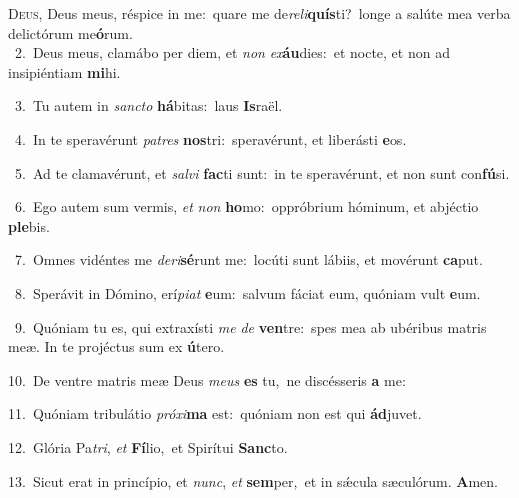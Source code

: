 \lettrine{\initial\textcolor{\initialcolor}{D}}{eus,} Deus meus, réspice in me:~\dagger quare me de\-\textit{re}\-\textit{li}\textbf{quís}ti?~\star longe a salúte mea verba delictórum me\-\textbf{ó}\-rum.\\
{\numbfont\textcolor{\numbcolor}{~2.}}~Deus meus, clamábo per diem, et \textit{non} \textit{ex}\-\textbf{áu}dies:~\star et nocte, et non ad insipiéntiam \textbf{mi}\-hi.\par
{\numbfont\textcolor{\numbcolor}{~3.}}~Tu autem in \textit{sanc}\-\textit{to} \textbf{há}\-bitas:~\star laus \textbf{Is}\-raël.\par
{\numbfont\textcolor{\numbcolor}{~4.}}~In te speravérunt \textit{pa}\-\textit{tres} \textbf{nos}\-tri:~\star speravérunt, et liberásti \textbf{e}\-os.\par
{\numbfont\textcolor{\numbcolor}{~5.}}~Ad te clamavérunt, et \textit{sal}\-\textit{vi} \textbf{fac}\-ti sunt:~\star in te speravérunt, et non sunt con\-\textbf{fú}\-si.\par
{\numbfont\textcolor{\numbcolor}{~6.}}~Ego autem sum vermis, \textit{et} \textit{non} \textbf{ho}\-mo:~\star oppróbrium hóminum, et abjéctio \textbf{ple}\-bis.\par
{\numbfont\textcolor{\numbcolor}{~7.}}~Omnes vidéntes me \textit{de}\-\textit{ri}\textbf{sé}runt me:~\star locúti sunt lábiis, et movérunt \textbf{ca}\-put.\par
{\numbfont\textcolor{\numbcolor}{~8.}}~Sperávit in Dómino, erí\-\textit{pi}\-\textit{at} \textbf{e}\-um:~\star salvum fáciat eum, quóniam vult \textbf{e}\-um.\par
{\numbfont\textcolor{\numbcolor}{~9.}}~Quóniam tu es, qui extraxísti \textit{me} \textit{de} \textbf{ven}\-tre:~\star spes mea ab ubéribus matris meæ. In te projéctus sum ex \textbf{ú}\-tero.\par
{\numbfont\textcolor{\numbcolor}{10.}}~De ventre matris meæ Deus \textit{me}\-\textit{us} \textbf{es} tu,~\star ne discésseris \textbf{a} me:\par
{\numbfont\textcolor{\numbcolor}{11.}}~Quóniam tribulátio \textit{pró}\-\textit{xi}\textbf{ma} est:~\star quóniam non est qui \textbf{ád}\-juvet.\par
{\numbfont\textcolor{\numbcolor}{12.}}~Glória Pa\-\textit{tri}\-, \textit{et} \textbf{Fí}\-lio,~\star et Spirítui \textbf{Sanc}\-to.\par
{\numbfont\textcolor{\numbcolor}{13.}}~Sicut erat in princípio, et \textit{nunc}\-, \textit{et} \textbf{sem}\-per,~\star et in sǽcula sæculórum. \textbf{A}\-men.\par
